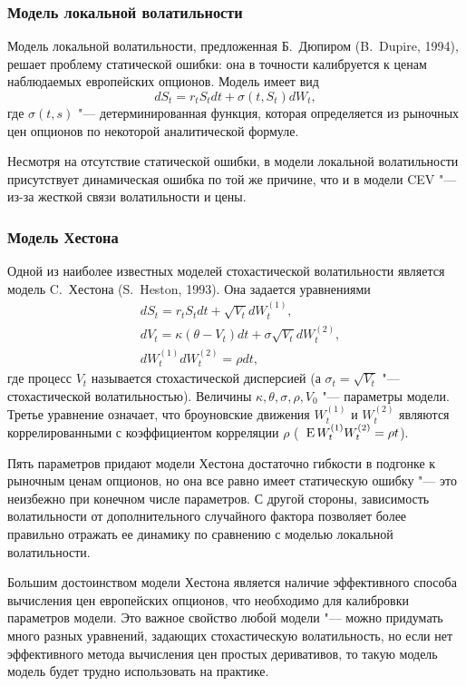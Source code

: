 \subsubsection{Модель локальной волатильности}

Модель локальной волатильности, предложенная Б.~Дюпиром (B.~Dupire, 1994), решает проблему статической ошибки: она в точности калибруется к ценам наблюдаемых европейских опционов.
Модель имеет вид
\[
d S_t = r_tS_t dt + \sigma(t,S_t) d W_t,
\]
где $\sigma(t,s)$ "--- детерминированная функция, которая определяется из рыночных цен опционов по некоторой аналитической формуле.

Несмотря на отсутствие статической ошибки, в модели локальной волатильности присутствует динамическая ошибка по той же причине, что и в модели CEV "--- из-за жесткой связи волатильности и цены.


\subsubsection{Модель Хестона}
Одной из наиболее известных моделей стохастической волатильности является модель C.~Хестона (S.~Heston, 1993).
Она задается уравнениями
\begin{align*}
&d S_t = r_tS_tdt + \sqrt{V_t} d W_t^{(1)},\\
&d V_t = \kappa(\theta - V_t)dt + \sigma \sqrt{V_t} d W_t^{(2)},\\
&d W_t^{(1)} d W_t^{(2)} = \rho dt,
\end{align*}
где процесс $V_t$ называется стохастической дисперсией (а $\sigma_t = \sqrt{V_t}$ "--- стохастической волатильностью).
Величины $\kappa,\theta,\sigma,\rho, V_0$ "--- параметры модели.
Третье уравнение означает, что броуновские движения $W_t^{(1)}$ и $W_t^{(2)}$ являются коррелированными с коэффициентом корреляции $\rho$ (\te\ $\operatorname{E} W_t^{(1)}W_t^{(2)} = \rho t$).

Пять параметров придают модели Хестона достаточно гибкости в подгонке к рыночным ценам опционов, но она все равно имеет статическую ошибку "--- это неизбежно при конечном числе параметров.
С другой стороны, зависимость волатильности от дополнительного случайного фактора позволяет более правильно отражать ее динамику по сравнению с моделью локальной волатильности. 

Большим достоинством модели Хестона является наличие эффективного способа вычисления цен европейских опционов, что необходимо для калибровки параметров модели.
Это важное свойство любой модели "--- можно придумать много разных уравнений, задающих стохастическую волатильность, но если нет эффективного метода вычисления цен простых деривативов, то такую модель модель будет трудно использовать на практике.

